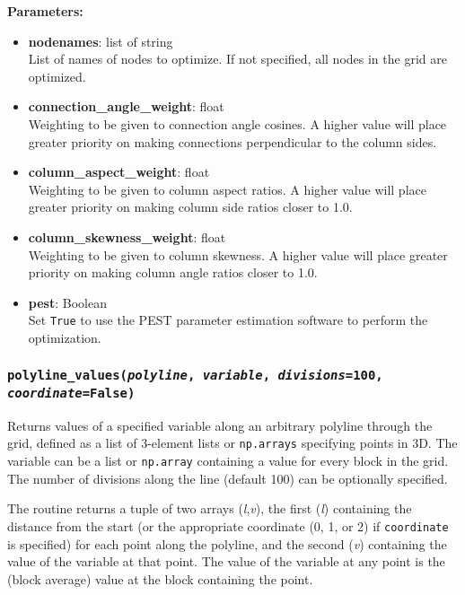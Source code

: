 \textbf{Parameters:}
\begin{itemize}
\item \textbf{nodenames}: list of string\\
  List of names of nodes to optimize.  If not specified, all nodes in the grid are optimized.
\item \textbf{connection\_angle\_weight}: float\\
  Weighting to be given to connection angle cosines.  A higher value will place greater priority on making connections perpendicular to the column sides.
\item \textbf{column\_aspect\_weight}: float\\
  Weighting to be given to column aspect ratios.  A higher value will place greater priority on making column side ratios closer to 1.0.
\item \textbf{column\_skewness\_weight}: float\\
  Weighting to be given to column skewness.  A higher value will place greater priority on making column angle ratios closer to 1.0.
\item \textbf{pest}: Boolean\\
  Set \texttt{True} to use the PEST parameter estimation software to perform the optimization.
\end{itemize}

\subsubsection{\texttt{polyline\_values(\emph{polyline}, \emph{variable}, \emph{divisions}=100, \emph{coordinate}=\texttt{False})}}

Returns values of a specified variable along an arbitrary polyline through the grid, defined as a list of 3-element lists or \texttt{np.arrays} specifying points in 3D.  The variable can be a list or \texttt{np.array} containing a value for every block in the grid.  The number of divisions along the line (default 100) can be optionally specified.

The routine returns a tuple of two arrays (\emph{l},\emph{v}), the first (\emph{l}) containing the distance from the start (or the appropriate coordinate (0, 1, or 2) if \texttt{coordinate} is specified) for each point along the polyline, and the second (\emph{v}) containing the value of the variable at that point.  The value of the variable at any point is the (block average) value at the block containing the point.

